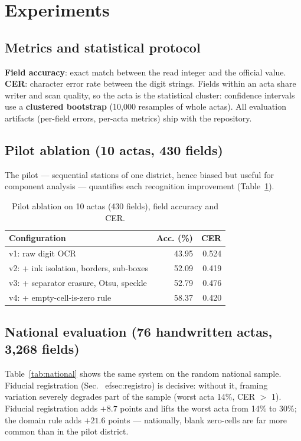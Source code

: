 \documentclass[conference]{IEEEtran}
\begin{document}
\section{Experiments}
\subsection{Metrics and statistical protocol}
\textbf{Field accuracy}: exact match between the read integer and the
official value. \textbf{CER}: character error rate between the digit strings.
Fields within an acta share writer and scan quality, so the acta is the
statistical cluster: confidence intervals use a \textbf{clustered bootstrap}
(10,000 resamples of whole actas). All evaluation artifacts (per-field
errors, per-acta metrics) ship with the repository.

\subsection{Pilot ablation (10 actas, 430 fields)}
The pilot --- sequential stations of one district, hence biased but useful
for component analysis --- quantifies each recognition improvement
(Table~\ref{tab:pilot}).

\begin{table}[t]
\caption{Pilot ablation on 10 actas (430 fields), field accuracy and CER.}
\label{tab:pilot}
\centering
\begin{tabular}{lrr}
\toprule
Configuration & Acc. (\%) & CER \\
\midrule
v1: raw digit OCR & 43.95 & 0.524 \\
v2: + ink isolation, borders, sub-boxes & 52.09 & 0.419 \\
v3: + separator erasure, Otsu, speckle & 52.79 & 0.476 \\
v4: + empty-cell-is-zero rule & 58.37 & 0.420 \\
\bottomrule
\end{tabular}
\end{table}

\subsection{National evaluation (76 handwritten actas, 3,268 fields)}
Table~\ref{tab:national} shows the same system on the random national sample.
Fiducial registration (Sec.~
ef{sec:registro}) is decisive: without it, framing variation severely degrades part of the sample (worst
acta 14\%, CER $>$ 1). Fiducial registration adds $+8.7$ points and lifts the
worst acta from 14\% to 30\%; the domain rule adds $+21.6$ points ---
nationally, blank zero-cells are far more common than in the pilot district.
\end{document}
